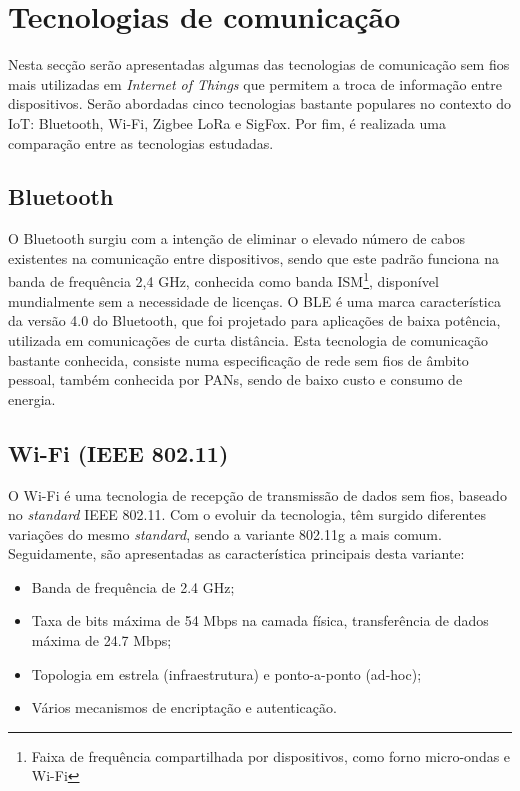 \section{Tecnologias de comunicação}
\label{state-tecc}
Nesta secção serão apresentadas algumas das tecnologias de comunicação sem fios mais utilizadas em \textit{Internet of Things} que permitem a troca de informação entre dispositivos. Serão abordadas cinco tecnologias bastante populares no contexto do \ac{IoT}: Bluetooth, Wi-Fi, Zigbee LoRa e SigFox. Por fim, é realizada uma comparação entre as tecnologias estudadas. 



	




\subsection{Bluetooth}

O Bluetooth surgiu com a intenção de eliminar o elevado número de cabos existentes na comunicação entre dispositivos, sendo que este padrão funciona na banda de frequência 2,4 GHz, conhecida como banda \ac{ISM}\footnote{Faixa de frequência compartilhada por dispositivos, como forno micro-ondas e Wi-Fi}, disponível mundialmente sem a necessidade de licenças. O \ac{BLE} é uma marca característica da versão 4.0 do Bluetooth, que foi projetado para aplicações de baixa potência, utilizada em comunicações de curta distância. Esta tecnologia de comunicação bastante conhecida, consiste numa especificação de rede sem fios de âmbito pessoal, também conhecida por \ac{PANs}, sendo de baixo custo e consumo de energia\cite{Bruno2002}\cite{BluetoothTM2001}.






\subsection{Wi-Fi (IEEE 802.11)}


O Wi-Fi é uma tecnologia de recepção de transmissão de dados sem fios, baseado no \textit{standard} IEEE 802.11. Com o evoluir da tecnologia, têm surgido diferentes variações do mesmo \textit{standard}, sendo a variante 802.11g a mais comum. Seguidamente, são apresentadas as característica principais desta variante\cite{Paper2005}\cite{urlwifi}:


\begin{itemize}
	\item Banda de frequência de 2.4 GHz;
	\item Taxa de bits máxima de 54 Mbps na camada física, transferência de dados máxima de 24.7 Mbps;
	\item Topologia em estrela (infraestrutura) e ponto-a-ponto (ad-hoc);
	\item Vários mecanismos de encriptação e autenticação.
\end{itemize}



